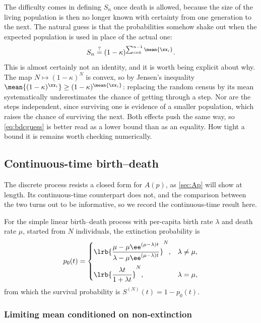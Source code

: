 The difficulty comes in defining $S_n$ once death is allowed, because the size of the
living population is then no longer known with certainty from one generation to the
next. The natural guess is that the probabilities somehow shake out when the expected
population is used in place of the actual one:
\begin{equation}
\label{eq:bdcguess}
S_n \overset{?}{=} (1-\kappa)^{\sum_{i=0}^{n-1}\mean{\xx_i}} .
\end{equation}
This is almost certainly not an identity, and it is worth being explicit about why. The
map $N\mapsto(1-\kappa)^N$ is convex, so by Jensen's inequality
$\mean{(1-\kappa)^{\xx_i}}\ge(1-\kappa)^{\mean{\xx_i}}$: replacing the random census by
its mean systematically underestimates the chance of getting through a step. Nor are the
steps independent, since surviving one is evidence of a smaller population, which raises
the chance of surviving the next. Both effects push the same way, so \cref{eq:bdcguess}
is better read as a lower bound than as an equality. How tight a bound it is remains
worth checking numerically.

\subsection{Continuous-time birth--death}
\label{sec:cts}

The discrete process resists a closed form for $A(p)$, as \cref{sec:Ap} will show at
length. Its continuous-time counterpart does not, and the comparison between the two
turns out to be informative, so we record the continuous-time result here.

For the simple linear birth--death process with per-capita birth rate $\lambda$ and
death rate $\mu$, started from $N$ individuals, the extinction probability is
\cite{Allen2010}
\begin{equation}
\label{eq:p0t}
p_0(t) = \begin{cases}
\lrb{\dfrac{\mu - \mu \ee^{(\mu-\lambda)t}}{\lambda - \mu \ee^{(\mu-\lambda)t}}}^{N}, & \lambda \neq \mu,\\[12pt]
\lrb{\dfrac{\lambda t}{1+\lambda t}}^{N}, & \lambda = \mu,
\end{cases}
\end{equation}
from which the survival probability is $S^{(N)}(t) = 1 - p_0(t)$.

\subsubsection*{Limiting mean conditioned on non-extinction}

